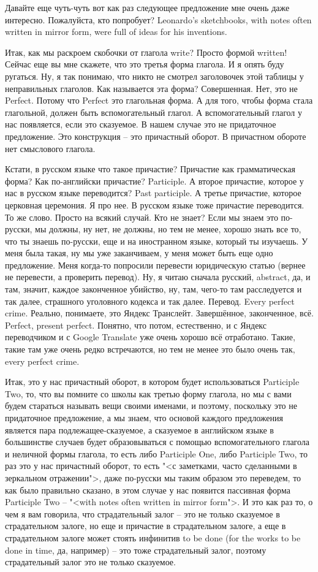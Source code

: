 \documentclass[main.tex]{subfiles}
\begin{document}
Давайте еще чуть-чуть вот как раз следующее предложение мне очень даже интересно.
Пожалуйста, кто попробует?
Leonardo's sketchbooks, with notes often written in mirror form, were full of ideas for his inventions.

Итак, как мы раскроем скобочки от глагола write? Просто формой written!
Сейчас еще вы мне скажете, что это третья форма глагола.
И я опять буду ругаться.
Ну, я так понимаю, что никто не смотрел заголовочек этой таблицы у неправильных глаголов.
Как называется эта форма? Совершенная.
Нет, это не Perfect.
Потому что Perfect это глагольная форма.
А для того, чтобы форма стала глагольной, должен быть вспомогательный глагол.
А вспомогательный глагол у нас появляется, если это сказуемое.
В нашем случае это не придаточное предложение.
Это конструкция -- это причастный оборот.
В причастном обороте нет смыслового глагола.

Кстати, в русском языке что такое причастие? Причастие как грамматическая форма?
Как по-английски причастие? Participle.
А второе причастие, которое у нас в русском языке переводится? Past participle.
А третье причастие, которое церковная церемония.
Я про нее.
В русском языке тоже причастие переводится.
То же слово.
Просто на всякий случай.
Кто не знает?
Если мы знаем это по-русски, мы должны, ну нет, не должны, но тем не менее, хорошо знать все то, что ты знаешь по-русски, еще и на иностранном языке, который ты изучаешь.
У меня была такая, ну мы уже заканчиваем, у меня может быть еще одно предложение.
Меня когда-то попросили перевести юридическую статью (вернее не перевести, а проверить перевод).
Ну, я читаю сначала русский, abstract, да, и там, значит, каждое законченное убийство, ну, там, чего-то там расследуется и так далее, страшного уголовного кодекса и так далее.
Перевод.
Every perfect crime.
Реально, понимаете, это Яндекс Транслейт.
Завершённое, законченное, всё.
Perfect, present perfect.
Понятно, что потом, естественно, и с Яндекс переводчиком и с Google Translate уже очень хорошо всё отработано.
Такие, такие там уже очень редко встречаются, но тем не менее это было очень так, every perfect crime.

Итак, это у нас причастный оборот, в котором будет использоваться Participle Two, то, что вы помните со школы как третью форму глагола, но мы с вами будем стараться называть вещи своими именами, и поэтому, поскольку это не придаточное предложение, а мы знаем, что основой каждого предложения является пара подлежащее-сказуемое, а сказуемое в английском языке в большинстве случаев будет образовываться с помощью вспомогательного глагола и неличной формы глагола, то есть либо Participle One, либо Participle Two, то раз это у нас причастный оборот, то есть "<с заметками, часто сделанными в зеркальном отражении">, даже по-русски мы таким образом это переведем, то как было правильно сказано, в этом случае у нас появится пассивная форма Participle Two -- "<with notes often written in mirror form">.
И это как раз то, о чем я вам говорила, что страдательный залог -- это не только сказуемое в страдательном залоге, но еще и причастие в страдательном залоге, а еще в страдательном залоге может стоять инфинитив to be done (for the works to be done in time, да, например) -- это тоже страдательный залог, поэтому страдательный залог это не только сказуемое.
\end{document}

